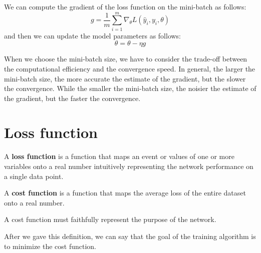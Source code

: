 We can compute the gradient of the loss function on the mini-batch as follows:
\begin{equation}
    g = \frac{1}{m} \sum_{i = 1}^{m} \nabla_{\theta} L(\hat{y}_i, y_i, \theta)
\end{equation}
and then we can update the model parameters as follows:
\begin{equation}
    \theta = \theta - \eta g
\end{equation}

When we choose the mini-batch size, we have to consider the trade-off between
the computational efficiency and the convergence speed. In general, the larger
the mini-batch size, the more accurate the estimate of the gradient, but the
slower the convergence. While the smaller the mini-batch size, the noisier the
estimate of the gradient, but the faster the convergence.
\section{Loss function}
\begin{definition}
    A \textbf{loss function} is a function that maps an event or values of one
    or more variables onto a real number intuitively representing the network
    performance on a single data point.
\end{definition}
\begin{definition}
    A \textbf{cost function} is a function that maps the average loss of the
    entire dataset onto a real number.

    A cost function must faithfully represent the purpose of the network.
\end{definition}

After we gave this definition, we can say that the goal of the training algorithm
is to minimize the cost function.

